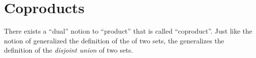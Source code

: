 
\section{Coproducts}
\label{sec:coproductset}


There exists a ``dual'' notion to ``product'' that is called ``coproduct''.
Just like the notion of  generalized the definition of the  of two sets, the  generalizes the definition of the \emph{disjoint union} of two sets.
%
%
%

